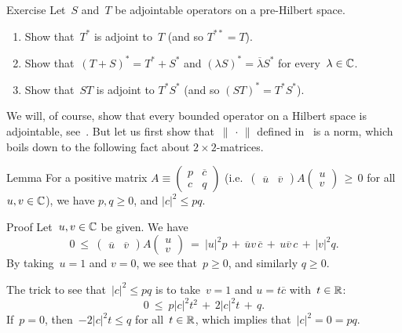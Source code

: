 \documentclass[a]{subfiles}
\begin{document}
\begin{parsec}[hilb]
\begin{point}
\end{point}
\begin{point}{Exercise}%
Let~$S$ and~$T$ be adjointable operators on a pre-Hilbert space.
\begin{enumerate}
\item
Show that~$T^*$ is adjoint to~$T$ (and so $T^{**}=T$).
\item
Show that~$(T+S)^*=T^*+S^*$
and $(\lambda S)^*=\overline{\lambda}S^*$
for every~$\lambda\in \mathbb{C}$.
\item
Show that~$ST$ is adjoint to $T^*S^*$ (and so $(ST)^*=T^*S^*$).
\end{enumerate}
We will, of course, show
that every bounded operator on a Hilbert space is adjointable,
see~.
But let us first show that~$\|\,\cdot\,\|$
defined in~ is a norm,
which boils down to the following fact
about  $2\times 2$-matrices.
\end{point}
\begin{point}{Lemma}%
For a positive matrix $A\equiv 
\left(\begin{smallmatrix}p & \overline{c} \\ c & q\end{smallmatrix}\right)$
(i.e.~$\left(
\begin{smallmatrix}\overline{u}&\overline{v}\end{smallmatrix}\right)
A
\left(\begin{smallmatrix}u \\ v \end{smallmatrix}\right) \,\geq \, 0$
for all~$u,v\in \mathbb{C}$),
we have
$p,q\geq 0$, and $\left|c\right|^2 \leq pq$.
\begin{point}{Proof}%
Let~$u,v\in\mathbb{C}$ be given.
We have
\begin{equation*}
0\ \leq\ 
\left(\begin{smallmatrix}\overline{u}&\overline{v}\end{smallmatrix}\right)
A
\left(\begin{smallmatrix}u \\ v \end{smallmatrix}\right)
\ = \ 
\left|u\right|^2 p\,+\, 
\overline{u}v\,\overline{c} \,+\,
u\overline{v}\,c \,+\,
\left|v\right|^2 q.
\end{equation*}
By taking~$u=1$ and $v=0$, we see that~$p\geq 0$,
and similarly $q\geq 0$.

The trick to see that~$\left|c\right|^2\leq pq$
is to
take~$v=1$ and $u=t\overline{c}$ with~$t\in \mathbb{R}$:
\begin{equation*}
0 \ \leq\ p\left|c\right|^2t^2
\,+\,2\left|c\right|^2t 
\,+\, q.
\end{equation*}
If~$p=0$, then~$-2\left|c\right|^2t \leq q $
for all~$t\in \mathbb{R}$,
which implies that~$\left|c\right|^2=0=pq$.


\end{point}
\end{point}
\end{parsec}
\end{document}
